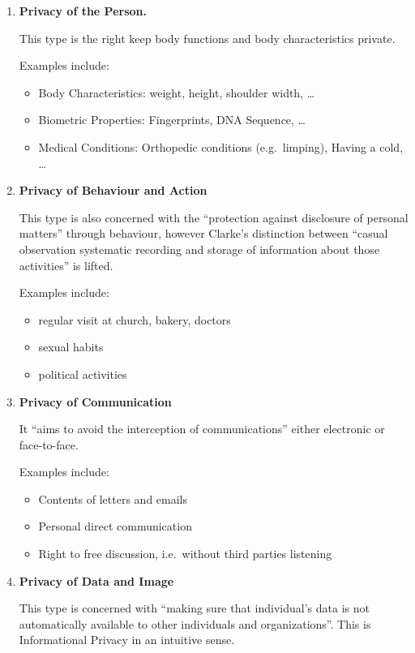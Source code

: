 \begin{enumerate}

\item \textbf{Privacy of the Person.}

This type is the right keep body functions and body characteristics private.

Examples include:
\begin{itemize}
\item Body Characteristics: weight, height, shoulder width, \ldots
\item Biometric Properties: Fingerprints, DNA Sequence, \ldots
\item Medical Conditions: Orthopedic conditions (e.g.~limping), Having a cold, \ldots
\end{itemize}

\item \textbf{Privacy of Behaviour and Action}

This type is also concerned with the ``protection against disclosure of personal matters'' through behaviour, however Clarke's distinction between ``casual observation \om systematic recording and storage of information about those activities'' is lifted.

Examples include:
\begin{itemize}
\item regular visit at church, bakery, doctors
\item sexual habits
\item political activities
\end{itemize}

\item \textbf{Privacy of Communication}

It ``aims to avoid the interception of communications'' either electronic or face-to-face.

Examples include:
\begin{itemize}
\item Contents of letters and emails
\item Personal direct communication
\item Right to free discussion, i.e.~without third parties listening
\end{itemize}

\item \textbf{Privacy of Data and Image}

This type is concerned with ``making sure that individual's data is not automatically available to other individuals and organizations''.
This is Informational Privacy in an intuitive sense.


\end{enumerate}
